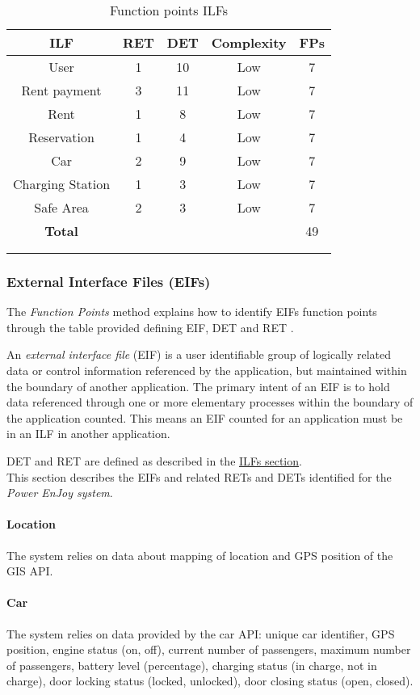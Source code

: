 \begin{longtable}{ccccc}
\toprule
\textbf{ILF}			&	RET	&	DET	&	Complexity  & \textbf{FPs}\\
\midrule
User			&	1	&	10		&	Low & 7 \\
Rent payment & 3 & 11 & Low & 7 \\
Rent & 1 & 8 & Low & 7 \\
Reservation & 1 & 4 & Low & 7 \\
Car & 2 & 9 & Low & 7\\
Charging Station & 1 & 3 & Low & 7 \\
Safe Area & 2 & 3 & Low & 7 \\
\midrule
\textbf{Total} & & & & 49\\
\bottomrule \\
\caption{Function points ILFs}
\label{tbl:ilfFP}
\end{longtable}

\clearpage

\subsubsection{External Interface Files (EIFs)}
The \emph{Function Points} method explains how to identify EIFs function points through the table provided defining EIF, DET and RET \cite{FP}.

An \emph{external interface file} (EIF) is a user identifiable group of logically related data or control information referenced by the application, but maintained within the boundary of another application. The primary intent of an EIF is to hold data referenced through one or more elementary processes within the boundary of the application counted. This means an EIF counted for an application must be in an ILF in another application.

DET and RET are defined as described in the \hyperref[sec:ILFs]{ILFs section}.\\

This section describes the EIFs and related RETs and DETs identified for the \emph{Power EnJoy system}.

\paragraph{Location} The system relies on data about mapping of location and GPS position of the GIS API.

\paragraph{Car} The system relies on data provided by the car API: unique car identifier, GPS position, engine status (on, off), current number of passengers, maximum number of passengers, battery level (percentage), charging status (in charge, not in charge), door locking status (locked, unlocked), door closing status (open, closed).

